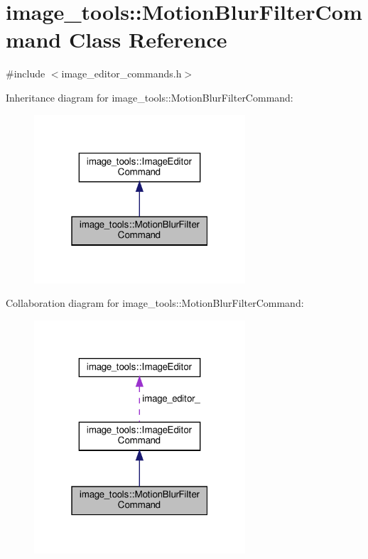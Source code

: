 \hypertarget{classimage__tools_1_1MotionBlurFilterCommand}{}\section{image\+\_\+tools\+:\+:Motion\+Blur\+Filter\+Command Class Reference}
\label{classimage__tools_1_1MotionBlurFilterCommand}


{\ttfamily \#include $<$image\+\_\+editor\+\_\+commands.\+h$>$}



Inheritance diagram for image\+\_\+tools\+:\+:Motion\+Blur\+Filter\+Command\+:
\nopagebreak
\begin{figure}[H]
\begin{center}
\leavevmode
\includegraphics[width=223pt]{classimage__tools_1_1MotionBlurFilterCommand__inherit__graph}
\end{center}
\end{figure}


Collaboration diagram for image\+\_\+tools\+:\+:Motion\+Blur\+Filter\+Command\+:
\nopagebreak
\begin{figure}[H]
\begin{center}
\leavevmode
\includegraphics[width=223pt]{classimage__tools_1_1MotionBlurFilterCommand__coll__graph}
\end{center}
\end{figure}
